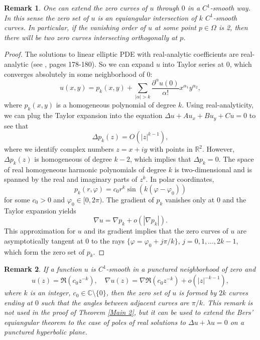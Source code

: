 \documentclass{article}
\newtheorem{remark}{Remark}[section]
\begin{document}
\begin{remark}
 One can extend the zero curves of $u$ through $0$ in a $C^1$-smooth way. In this sense the zero set of $u$ is an equiangular intersection of $k$ $C^1$-smooth curves.
In particular, if the vanishing order of $u$ at some point $p\in \Omega$ is 2, then there will be two zero curves intersecting orthogonally at $p$.
    
\end{remark}
\begin{proof} The solutions to linear elliptic PDE with real-analytic coefficients are real-analytic (see \cite{Hormander}, pages 178-180). So we can expand 
$u$ into Taylor series at $0$, which converges absolutely in some neighborhood of $0$:
$$ u(x,y)= p_k(x,y) + \sum_{|\alpha|>k} \frac{\partial^\alpha u(0)}{\alpha!}x^{\alpha_1}y^{\alpha_2},$$
where $p_k(x,y)$ is a homogeneous polynomial of degree $k$.
Using real-analyticity, we can plug the Taylor expansion into the equation $\Delta u + Au_x+Bu_y+Cu =0$ to see that
$$\Delta p_k(z)= O(|z|^{k-1}), $$
where we identify complex numbers $z=x+iy$ with points in $\mathbb{R}^2$.
However, $\Delta p_k(z)$ is homogeneous of degree $k-2$, which implies that $\Delta p_k=0$. The space of real homogeneous harmonic polynomials of degree $k$ is two-dimensional and is spanned by the real and imaginary parts of $z^k$.
In polar coordinates, 
$$p_k(r,\varphi)= c_0 r^k \sin(k(\varphi-\varphi_0))$$
for some $c_0>0$ and $\varphi_0 \in [0,2\pi)$.
The gradient of $p_k$ vanishes only at $0$ and the Taylor expansion yields
$$ \nabla u = \nabla p_k + o(|\nabla p_k|).$$
This approximation for $u$ and its gradient implies that the zero curves of $u$ are asymptotically tangent at $0$ to the rays $\{\varphi=\varphi_0+j\pi/k\}$, $j=0,1,\dots, 2k-1$, which form the zero set of $p_k$.
    
\end{proof}
\begin{remark} \label{Rem: Bers'} If a function $u$ is $C^1$-smooth in a punctured neighborhood of zero
and $$u(z)=\Re(c_0z^{-k}), \quad \nabla u(z)=\nabla\Re( c_0z^{-k})+o(|z|^{-k-1}),$$ 
where $k$ is an integer, $c_0 \in \mathbb{C}\setminus\{0\}$, then
the zero set of $u$ is formed by $2k$ curves ending at $0$ such that the angles between adjacent curves are $\pi/k$. This remark is not used in the proof of Theorem \ref{Main 2}, but it can be used to extend the Bers' equiangular theorem to the case of poles of real solutions to $\Delta u + \lambda u=0$
on a punctured hyperbolic plane.
\end{remark}
\end{document}
